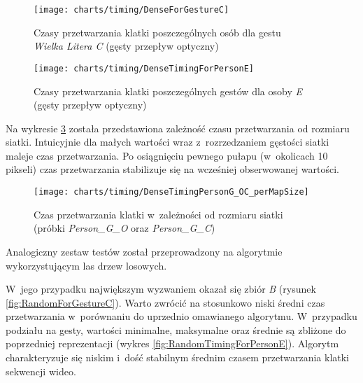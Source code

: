     \begin{figure}[!ht]
      \centering
      \texttt{[image: charts/timing/DenseForGestureC]}
      \caption[Czasy przetwarzania klatki poszczególnych osób dla gestu \\Wielka Litera C (gęsty przepływ optyczny)]
              {Czasy przetwarzania klatki poszczególnych osób dla gestu \\\textit{Wielka Litera C} (gęsty przepływ optyczny)}
      \label{fig:DenseForGestureC}
    \end{figure}

    \begin{figure}[!ht]
      \centering
      \texttt{[image: charts/timing/DenseTimingForPersonE]}
      \caption[Czasy przetwarzania klatki poszczególnych gestów dla osoby E\\(gęsty przepływ optyczny)]
              {Czasy przetwarzania klatki poszczególnych gestów dla osoby \textit{E}\\(gęsty przepływ optyczny)}
      \label{fig:DenseTimingForPersonE}
    \end{figure}

    \newpage
    Na wykresie \ref{fig:DenseTimingPerMapSize} została przedstawiona zależność czasu przetwarzania od rozmiaru siatki. Intuicyjnie dla małych wartości wraz z~rozrzedzaniem gęstości siatki maleje czas przetwarzania. Po osiągnięciu pewnego pułapu (w~okolicach 10 pikseli) czas przetwarzania stabilizuje się na wcześniej obserwowanej wartości.

    \begin{figure}[!ht]
      \centering
      \texttt{[image: charts/timing/DenseTimingPersonG\_OC\_perMapSize]}
      \caption[Czas przetwarzania klatki w~zależności od rozmiaru siatki]
              {Czas przetwarzania klatki w~zależności od rozmiaru siatki\\(próbki \textit{Person\_G\_O} oraz \textit{Person\_G\_C})}
      \label{fig:DenseTimingPerMapSize}
    \end{figure}

    Analogiczny zestaw testów został przeprowadzony na algorytmie wykorzystującym las drzew losowych.

    W~jego przypadku największym wyzwaniem okazał się zbiór \textit{B} (rysunek \ref{fig:RandomForGestureC}). Warto zwrócić na stosunkowo niski średni czas przetwarzania w~porównaniu do uprzednio omawianego algorytmu. W~przypadku podziału na gesty, wartości minimalne, maksymalne oraz średnie są zbliżone do poprzedniej reprezentacji (wykres \ref{fig:RandomTimingForPersonE}). Algorytm charakteryzuje się niskim i~dość stabilnym średnim czasem przetwarzania klatki sekwencji wideo.

